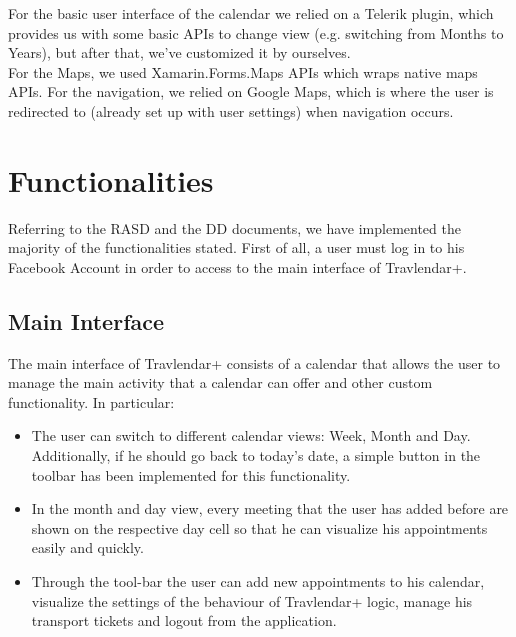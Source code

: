 For the basic user interface of the calendar we relied on a Telerik plugin, which provides us with some basic APIs to change view (e.g. switching from Months to Years), but after that, we've customized it by ourselves. \\

For the Maps, we used Xamarin.Forms.Maps APIs which wraps native maps APIs. For the navigation, we relied on Google Maps, which is where the user is redirected to (already set up with user settings) when navigation occurs.

\section{Functionalities}
Referring to the RASD and the DD documents, we have implemented the majority of the functionalities stated.
First of all, a user must log in to his Facebook Account in order to access to the main interface of Travlendar+.

\subsection*{Main Interface}
The main interface of Travlendar+ consists of a calendar that allows the user to manage the main activity that a calendar can offer and other custom functionality. In particular:
\begin{itemize}
\item The user can switch to different calendar views: Week, Month and Day. Additionally, if he should go back to today's date, a simple button in the toolbar has been implemented for this functionality.
\item In the month and day view, every meeting that the user has added before are shown on the respective day cell so that he can visualize his appointments easily and quickly. 
\item Through the tool-bar the user can add new appointments to his calendar, visualize the settings of the behaviour of Travlendar+ logic, manage his transport tickets and logout from the application. 
\end{itemize}

